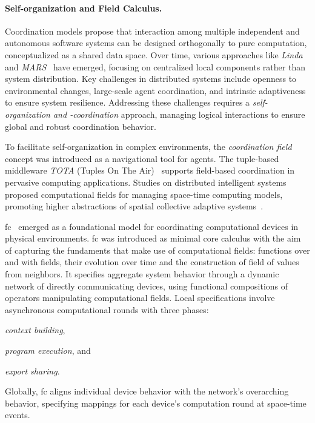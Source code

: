 \documentclass[12pt, a4paper]{article}
\newenvironment{inlinelist}{\begin{enumerate*}[label=\emph{(\roman*)}]}{\end{enumerate*}}
\begin{document}
\paragraph{Self-organization and Field Calculus.}

Coordination models propose that interaction among multiple independent and autonomous software systems can be designed
orthogonally to pure computation, conceptualized as a shared data space.
%
Over time,
various approaches like \textit{Linda}~\cite{ViroliCoordination2012} and \textit{MARS}~\cite{mars} have emerged,
focusing on centralized local components rather than system distribution.
%
Key challenges in distributed systems include openness to environmental changes, large-scale agent coordination,
and intrinsic adaptiveness to ensure system resilience.
%
Addressing these challenges requires a \emph{self-organization and -coordination} approach,
managing logical interactions to
ensure global and robust coordination behavior.

To facilitate self-organization in complex environments, the \emph{coordination field} concept was introduced as a
navigational tool for agents.
%
The tuple-based middleware \textit{TOTA} (Tuples On The Air)~\cite{tota} supports field-based coordination in pervasive
computing applications.
%
Studies on distributed intelligent systems proposed computational fields for managing space-time
computing models, promoting higher abstractions of spatial collective adaptive systems~\cite{JLAMP2019}.

\ac{fc}~\cite{TOCL2019} emerged as a foundational model for coordinating computational devices in physical environments.
%
\ac{fc} was introduced as minimal core calculus with the aim of capturing the fundaments that make use of computational fields:
functions over and with fields, their evolution over time and the construction of field of values from neighbors.
%
It specifies aggregate system behavior through a dynamic network of directly communicating devices,
using functional compositions of operators manipulating computational fields.
%
Local specifications involve asynchronous computational rounds with three phases:
\begin{inlinelist}
    \item \emph{context building},
    \item \emph{program execution}, and
    \item \emph{export sharing}.
\end{inlinelist}
%
Globally,
\ac{fc} aligns individual device behavior with the network's overarching behavior,
specifying mappings for each device's computation round at space-time events.
\end{document}
